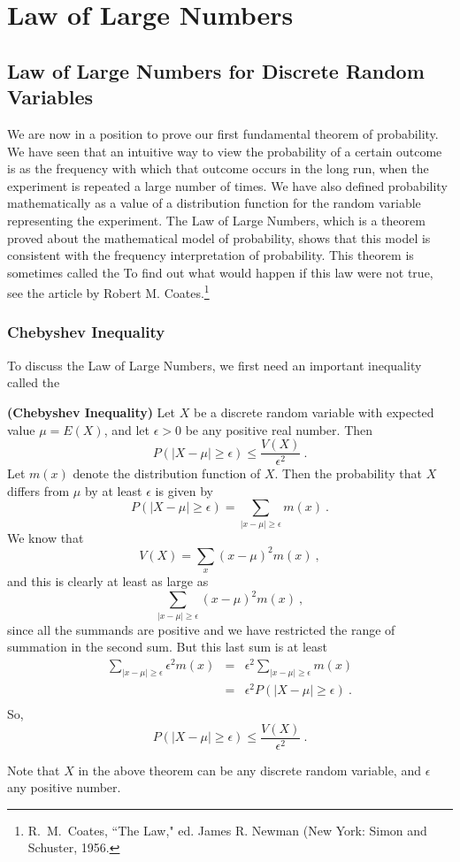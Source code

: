 \chapter{Law of Large Numbers}\label{chp 8} 

\section[Discrete Random Variables]{Law of Large Numbers for Discrete Random Variables}
\label{sec 8.1}
We are now in a position to prove our first fundamental theorem of probability.  
We have seen that an intuitive way to view the probability of a certain outcome is as the 
frequency with which that outcome occurs in the long run, when the experiment is repeated a large 
number of times.  We have also defined probability mathematically as a value of a distribution 
function for the random variable representing the experiment.   The Law of Large Numbers, which is
a theorem proved about the mathematical model of probability, shows that this model is consistent 
with the frequency interpretation of probability.  This theorem is sometimes called the   To find out what would happen if this law were not true, see the article  by 
Robert M. Coates.\footnote{R.~M.~Coates, ``The Law,"  ed. James R. Newman (New York: Simon and Schuster, 1956.}

\subsection*{Chebyshev Inequality}
To discuss the Law of Large Numbers, we first need an important inequality
called the 

\begin{theorem}{\bf (Chebyshev Inequality)}
Let $X$ be a discrete random variable with expected value $\mu = E(X)$, and let $\epsilon
> 0$ be any positive real number.  Then
$$
P(|X - \mu| \geq \epsilon) \leq \frac {V(X)}{\epsilon^2}\ .
$$
\proof
Let $m(x)$ denote the distribution function of $X$.  Then the probability that $X$
differs from $\mu$ by at least $\epsilon$ is given by
$$P(|X - \mu| \geq \epsilon) = \sum_{|x - \mu| \geq \epsilon} m(x)\ .$$
We know that 
$$V(X) = \sum_x (x - \mu)^2 m(x)\ ,$$
and this is clearly at least as large as
$$\sum_{|x - \mu| \geq \epsilon} (x - \mu)^2 m(x)\ ,$$
since all the summands are positive and we have restricted the range of summation in the
second sum.  But this last sum is at least
\begin{eqnarray*}
\sum_{|x - \mu| \geq \epsilon} \epsilon^2 m(x) &=& 
\epsilon^2 \sum_{|x - \mu| \geq \epsilon} m(x) \\
&=& \epsilon^2 P(|X - \mu| \geq \epsilon)\ .\\
\end{eqnarray*}
So,
$$ P(|X - \mu| \geq \epsilon) \leq \frac {V(X)}{\epsilon^2}\ .
$$
\end{theorem}
Note that $X$ in the above theorem can be any discrete random variable, and
$\epsilon$ any positive number.

